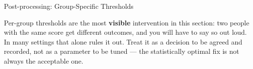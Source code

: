 \begin{frame}{Post-processing: Group-Specific Thresholds}
    \vspace{0.6em}
    \begin{tcolorbox}[colback=raiAmber!5, colframe=raiAmber!70, title=Before you reach for this]
        \scriptsize Per-group thresholds are the most \textbf{visible} intervention in this section:
        two people with the same score get different outcomes, and you will have to say so out loud.
        In many settings that alone rules it out. Treat it as a decision to be agreed and recorded,
        not as a parameter to be tuned --- the statistically optimal fix is not always the
        acceptable one.
    \end{tcolorbox}
\end{frame}
